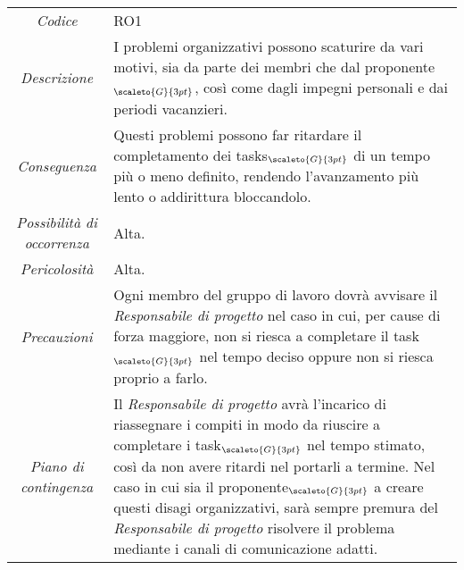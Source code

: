 {{{{	\begin{center}
		\renewcommand{\arraystretch}{1.4}
		\begin{tabularx}{\textwidth}{|c|X|}
			\hline
			\rowcolor{airforceblue}
			\multicolumn{2}{|c|}{\textit{Problemi organizzativi}}\\
			\hline
			\textit{Codice} & RO1 \\
			\hline
			\textit{Descrizione} & I problemi organizzativi possono scaturire da vari motivi, sia da parte dei membri che dal proponente$_{\scaleto{G}{3pt}}$, così come dagli impegni personali e dai periodi vacanzieri.  \\
			\hline
			\textit{Conseguenza} & Questi problemi possono far ritardare il completamento dei tasks$_{\scaleto{G}{3pt}}$ di un tempo più o meno definito, rendendo l'avanzamento più lento o addirittura bloccandolo. \\
			\hline
			\textit{Possibilità di occorrenza} & Alta. \\
			\hline
			\textit{Pericolosità} & Alta. \\
			\hline
			\textit{Precauzioni} & Ogni membro del gruppo di lavoro dovrà avvisare il \textit{Responsabile di progetto} nel caso in cui, per cause di forza maggiore, non si riesca a completare il task$_{\scaleto{G}{3pt}}$ nel tempo deciso oppure non si riesca proprio a farlo. \\
			\hline
			\textit{Piano di contingenza} & Il \textit{Responsabile di progetto} avrà l'incarico di riassegnare i compiti in modo da riuscire a completare i task$_{\scaleto{G}{3pt}}$ nel tempo stimato, così da non avere ritardi nel portarli a termine.
			Nel caso in cui sia il proponente$_{\scaleto{G}{3pt}}$ a creare questi disagi organizzativi, sarà sempre premura del \textit{Responsabile di progetto} risolvere il problema mediante i canali di comunicazione adatti.  \\
			\hline
		\end{tabularx}
	\end{center}


\def\tabularxcolumn#1{m{#1}}
{

}}}}}
